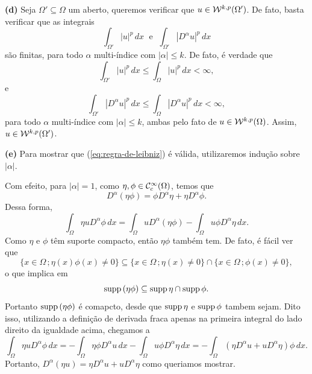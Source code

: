 \begin{prf}
    \textbf{(d)} Seja $\Omega' \subseteq \Omega$ um aberto, queremos verificar que $u \in \mathcal{W}^{k,p}(\Omega')$.
    De fato, basta verificar que as integrais
    \[
        \int_{\Omega'} |u|^p \, dx \;\text{ e }\; \int_{\Omega'} |D^{\alpha}u|^p \, dx
    \]
    são finitas, para todo $\alpha$ multi-índice com $|\alpha| \leqslant k$. De fato, é verdade que
    \[
        \int_{\Omega'} |u|^p \, dx \leqslant \int_{\Omega} |u|^p \,dx < \infty,
    \]
    e
    \[
        \int_{\Omega'} |D^\alpha u|^p \, dx \leqslant \int_{\Omega} |D^\alpha u|^p \,dx < \infty,
    \]
    para todo $\alpha$ multi-índice com $|\alpha| \leqslant k$, ambas pelo fato de $u \in \mathcal{W}^{k,p}(\Omega)$.
    Assim, $u \in \mathcal{W}^{k,p}(\Omega')$.

    \textbf{(e)} Para mostrar que (\ref{eq:regra-de-leibniz}) é válida, utilizaremos indução sobre $|\alpha|$. 
    
    Com efeito, para $|\alpha|= 1$, como $\eta,\phi \in \mathcal{C}^{\infty}_c(\Omega)$, temos que
    \[
        D^{\alpha} (\eta \phi) = \phi D^{\alpha}\eta + \eta D^{\alpha} \phi.
    \]
    Dessa forma,
    \[
        \int_\Omega \eta u D^{\alpha} \phi \, dx = \int_\Omega u D^{\alpha} (\eta \phi) - \int_\Omega u\phi D^{\alpha} \eta \, dx.
    \]
    Como $\eta$ e $\phi$ têm suporte compacto, então $\eta\phi$ também tem.
    De fato, é fácil ver que
    \[
        \{x \in \Omega \,; \eta(x)\phi(x) \neq 0\} \subseteq \{x \in \Omega \,; \eta(x) \neq 0\} \cap \{x \in \Omega \,; \phi(x) \neq 0\},
    \] 
    o que implica em
    \[
        \mathrm{supp}\,(\eta\phi) \subseteq \mathrm{supp}\, \eta \cap \mathrm{supp}\, \phi.
    \]
    Portanto $\mathrm{supp}\,(\eta\phi)$ é comapcto, desde que $\mathrm{supp}\, \eta$ e $\mathrm{supp}\, \phi$ tambem sejam.
    Dito isso, utilizando a definição de derivada fraca apenas na primeira integral do lado direito da igualdade acima, chegamos a
    \[
        \int_\Omega \eta u D^{\alpha} \phi \, dx = -\int_\Omega \eta \phi D^{\alpha} u \, dx - \int_\Omega u\phi D^{\alpha} \eta \, dx = -\int_\Omega (\eta D^{\alpha}u + uD^{\alpha}\eta) \phi \,dx.
    \]
    Portanto, $D^{\alpha}(\eta u) = \eta D^{\alpha}u + uD^{\alpha}\eta$ como queriamos mostrar.


\end{prf}
